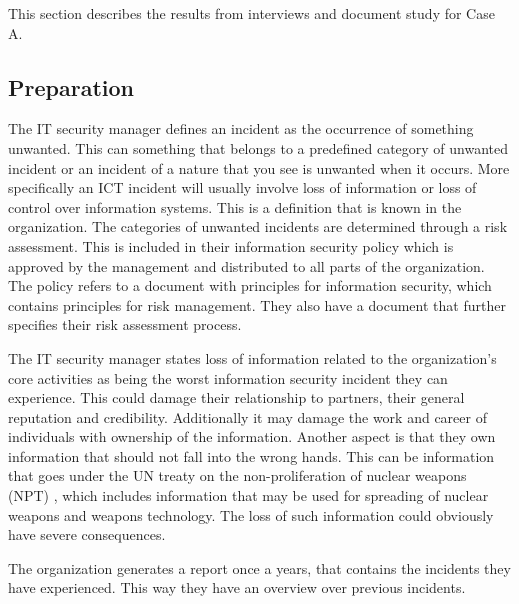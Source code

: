 This section describes the results from interviews and document study for Case A. 

\subsection{Preparation}
The IT security manager defines an incident %
as the occurrence of something unwanted. This can something that belongs to a predefined category of unwanted incident or an incident of a nature that you see is unwanted when it occurs. More specifically an \ac{ICT} incident will usually involve loss of information or loss of control over information systems. This is a definition that is known in the organization. The categories of unwanted incidents are determined through a risk assessment. This is included in their information security policy which is approved by the management and distributed to all parts of the organization. The policy refers to a document with principles for information security, which contains principles for risk management. They also have a document that further specifies their risk assessment process. %

The IT security manager states loss of information related to the organization's core activities as being the worst information security incident they can experience. This could damage their relationship to partners, their general reputation and credibility. Additionally it may damage the work and career of individuals with ownership of the information. %
Another aspect is that they own information that should not fall into the wrong hands. This can be information that goes under the \ac{UN} treaty on the non-proliferation of nuclear weapons (NPT) \cite{NPT}, which includes information that may be used for spreading of nuclear weapons and weapons technology. %
The loss of such information could obviously have severe consequences.

The organization generates a report once a years, that contains the incidents they have experienced. This way they have an overview over previous incidents.

